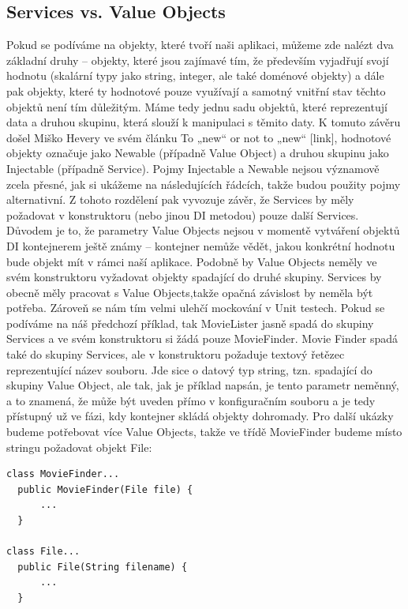 \documentclass[a4paper,conference]{IEEEtran}
\begin{document}
\subsection{Services vs. Value Objects}

Pokud se podíváme na objekty, které tvoří naši aplikaci, můžeme zde nalézt dva základní druhy – objekty, které jsou zajímavé tím, že především vyjadřují svojí hodnotu (skalární typy jako string, integer, ale také doménové objekty) a dále pak objekty, které ty hodnotové pouze využívají a samotný vnitřní stav těchto objektů není tím důležitým. Máme tedy jednu sadu objektů, které reprezentují data a druhou skupinu, která slouží k manipulaci s těmito daty. K tomuto závěru došel Miško Hevery ve svém článku To „new“ or not to „new“ [link], hodnotové objekty označuje jako Newable (případně Value Object) a druhou skupinu jako Injectable (případně Service). Pojmy Injectable a Newable nejsou významově zcela přesné, jak si ukážeme na následujících řádcích, takže budou použity pojmy alternativní. Z tohoto rozdělení pak vyvozuje závěr, že Services by měly požadovat v konstruktoru (nebo jinou DI metodou) pouze další Services. Důvodem je to, že parametry Value Objects nejsou v momentě vytváření objektů DI kontejnerem ještě známy – kontejner nemůže vědět, jakou konkrétní hodnotu bude objekt mít v rámci naší aplikace. Podobně by Value Objects neměly ve svém konstruktoru vyžadovat objekty spadající do druhé skupiny. Services by obecně měly pracovat s Value Objects,takže opačná závislost by neměla být potřeba. Zároveň se nám tím velmi ulehčí mockování v Unit testech.
Pokud se podíváme na náš předchozí příklad, tak MovieLister jasně spadá do skupiny Services a ve svém konstruktoru si žádá pouze MovieFinder. Movie Finder spadá také do skupiny Services, ale v konstruktoru požaduje textový řetězec reprezentující název souboru. Jde sice o datový typ string, tzn. spadající do skupiny Value Object, ale tak, jak je příklad napsán, je tento parametr neměnný, a to znamená, že může být uveden přímo v konfiguračním souboru a je tedy přístupný už ve fázi, kdy kontejner skládá objekty dohromady.
Pro další ukázky budeme potřebovat více Value Objects, takže ve třídě MovieFinder budeme místo stringu požadovat objekt File:

\lstset{language=Java, caption=Naplnění proměnné finder s využitím interface, label=listing:Java}
\begin{lstlisting}
class MovieFinder...
  public MovieFinder(File file) {
      ...
  }

class File...
  public File(String filename) {
      ...
  }
\end{lstlisting}
\end{document}
